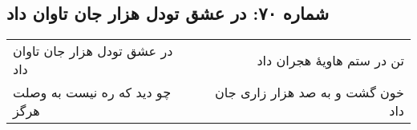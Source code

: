 \begin{center}
\section*{شماره ۷۰: در عشق تودل هزار جان تاوان داد}
\label{sec:070}
\begin{longtable}{l p{0.5cm} r}
در عشق تودل هزار جان تاوان داد
&&
تن در ستم هاویهٔ هجران داد
\\
چو دید که ره نیست به وصلت هرگز
&&
خون گشت و به صد هزار زاری جان داد
\\
\end{longtable}
\end{center}
